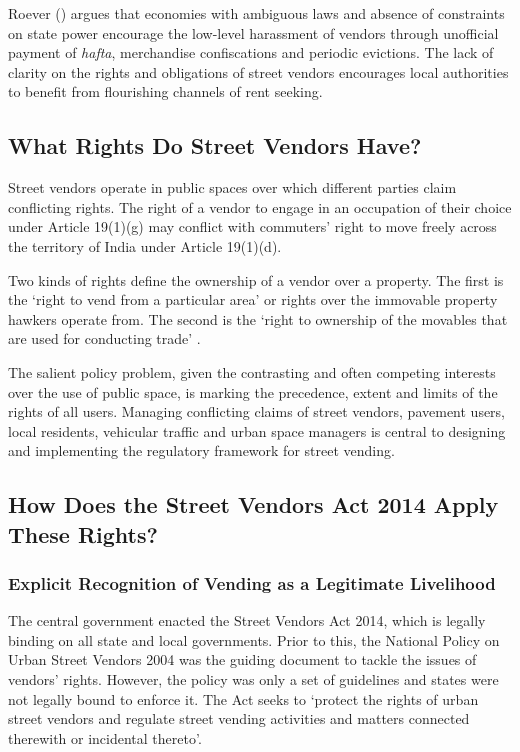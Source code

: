 \documentclass[a4paper, 12pt, twoside, table]{article}
\begin{document}
{Roever (\cite*{sallypaper}) argues that economies with ambiguous laws and absence of constraints on state power encourage the low-level harassment of vendors through unofficial payment of \textit{hafta}, merchandise confiscations and periodic evictions. The lack of clarity on the rights and obligations of street vendors encourages local authorities to benefit from flourishing channels of rent seeking. 

\subsection*{What Rights Do Street Vendors Have?}
Street vendors operate in public spaces over which different parties claim conflicting rights. The right of a  vendor to engage in an occupation of their choice under Article 19(1)(g) may conflict with commuters’ right to move freely across the territory of India under Article 19(1)(d). 

Two kinds of rights define the ownership of a vendor over a property. The first is the `right to vend from a particular area' or rights over the immovable property hawkers operate from. The second is the `right to ownership of the movables that are used for conducting trade' \parencite{ccspaper}.

The salient policy problem, given the contrasting and often competing interests over the use of public space, is marking the precedence, extent and limits of the rights of all users. Managing conflicting claims of street vendors, pavement users, local residents, vehicular traffic and urban space managers is central to designing and implementing the regulatory framework for street vending.
\newpage
\subsection*{How Does the Street Vendors Act 2014 Apply These Rights?}

\subsubsection*{Explicit Recognition of Vending as a Legitimate Livelihood}

The central government enacted the Street Vendors Act 2014, which is legally binding on all state and local governments. Prior to this, the National Policy on Urban Street Vendors 2004 was the guiding document to tackle the issues of vendors’ rights. However, the policy was only a set of guidelines and states were not legally bound to enforce it. The Act seeks to `protect the rights of urban street vendors and regulate street vending activities and matters connected therewith or incidental thereto'.

}
\end{document}
